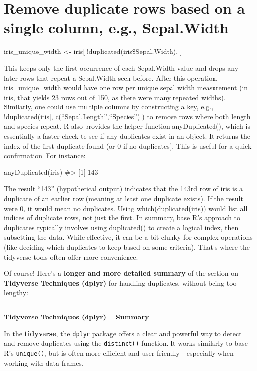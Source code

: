 \documentclass[
  man,
  floatsintext,
  longtable,
  nolmodern,
  notxfonts,
  notimes,
  colorlinks=true,linkcolor=blue,citecolor=blue,urlcolor=blue]{apa7}
\begin{document}
\section{Remove duplicate rows based on a single column, e.g.,
Sepal.Width}\label{remove-duplicate-rows-based-on-a-single-column-e.g.-sepal.width}

iris\_unique\_width \textless- iris{[} !duplicated(iris\$Sepal.Width),
{]}

This keeps only the first occurrence of each Sepal.Width value and drops
any later rows that repeat a Sepal.Width seen before. After this
operation, iris\_unique\_width would have one row per unique sepal width
measurement (in iris, that yields 23 rows out of 150, as there were many
repeated widths). Similarly, one could use multiple columns by
constructing a key, e.g., !duplicated(iris{[},
c(``Sepal.Length'',``Species''){]}) to remove rows where both length and
species repeat. R also provides the helper function anyDuplicated(),
which is essentially a faster check to see if any duplicates exist in an
object. It returns the index of the first duplicate found (or 0 if no
duplicates). This is useful for a quick confirmation. For instance:

anyDuplicated(iris) \#\textgreater{} {[}1{]} 143

The result ``143'' (hypothetical output) indicates that the 143rd row of
iris is a duplicate of an earlier row (meaning at least one duplicate
exists). If the result were 0, it would mean no duplicates. Using
which(duplicated(iris)) would list all indices of duplicate rows, not
just the first. In summary, base R's approach to duplicates typically
involves using duplicated() to create a logical index, then subsetting
the data. While effective, it can be a bit clunky for complex operations
(like deciding which duplicates to keep based on some criteria). That's
where the tidyverse tools often offer more convenience.

Of course! Here's a \textbf{longer and more detailed summary} of the
section on \textbf{Tidyverse Techniques (dplyr)} for handling
duplicates, without being too lengthy:

\begin{center}\rule{0.5\linewidth}{0.5pt}\end{center}

\textbf{Tidyverse Techniques (dplyr) -- Summary}

In the \textbf{tidyverse}, the \texttt{dplyr} package offers a clear and
powerful way to detect and remove duplicates using the
\texttt{distinct()} function. It works similarly to base R's
\texttt{unique()}, but is often more efficient and
user-friendly---especially when working with data frames.
\end{document}
